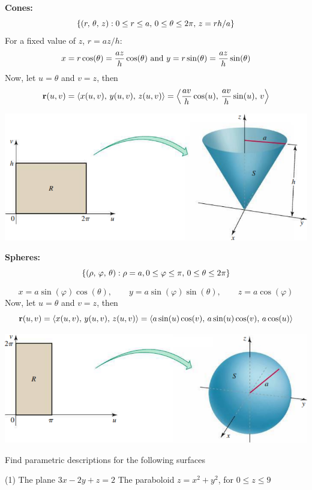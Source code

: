 \documentclass[../mathNotesPreamble]{subfiles}
\begin{document}
  \textbf{Cones:}
  \[{\left\{(r,\,\theta,\,z): 0\leq r\leq a,\, 0\leq\theta\leq 2\pi,\, z=rh/a\right\}}\]
  For a fixed value of $z$, $r=az/h$:
    \[x=r\cos(\theta)=\frac{az}{h}\cos(\theta) \textnormal{ and } y=r\sin(\theta)=\frac{az}{h}\sin(\theta)\]
  Now, let $u=\theta$ and $v=z$, then
    \[{\mathbf{r}}(u,v)={\left\langle x(u,v),\,y(u,v),\,z(u,v) \right\rangle}={\left\langle \frac{av}{h}\cos(u),\,\frac{av}{h}\sin(u),\,v \right\rangle}\]
  \begin{center}
    \includegraphics[width=0.7\linewidth]{../images/briggs_17_06/fig17_45}
  \end{center}
  \pagebreak

  \textbf{Spheres:}
  \[{\left\{(\rho,\,\varphi,\,\theta): \rho=a, 0\leq \varphi\leq \pi,\, 0\leq\theta\leq 2\pi\right\}}\]

  \[x=a\sin(\varphi)\cos(\theta), \qquad y=a\sin(\varphi)\sin(\theta), \qquad z=a\cos(\varphi)\]
  Now, let $u=\theta$ and $v=z$, then
    \[{\mathbf{r}}(u,v)={\left\langle x(u,v),\,y(u,v),\,z(u,v) \right\rangle}={\left\langle a\sin(u)\cos(v),\,a\sin(u)\cos(v),\,a\cos(u) \right\rangle}\]
  \begin{center}
    \includegraphics[width=0.7\linewidth]{../images/briggs_17_06/fig17_46}
  \end{center}
  \vspace*{0.5\baselineskip}

  \begin{ex*}
    Find parametric descriptions for the following surfaces
  \end{ex*}
  \begin{tasks}[after-item-skip=\stretch{1}, label=](1)
    \task The plane $3x-2y+z=2$
    \task The paraboloid $z=x^2+y^2$, for $0\leq z\leq 9$
  \end{tasks}
  \pagebreak
\end{document}
